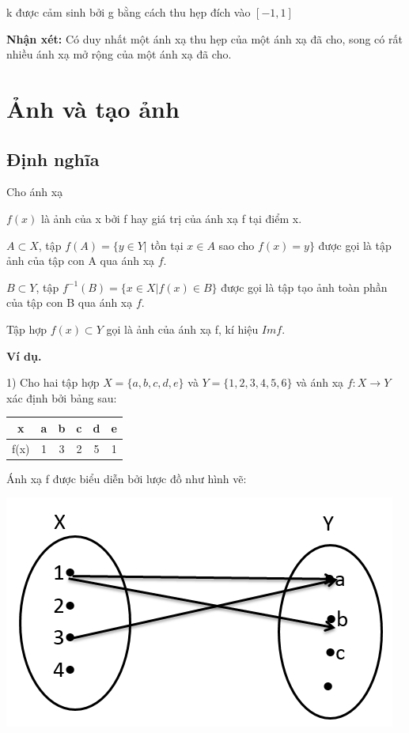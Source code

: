 \documentclass[12pt,oneside,a4paper,reqno]{book}
\begin{document}
         k được cảm sinh bởi g bằng cách thu hẹp đích vào $[-1,1]$
         
\textbf{Nhận xét:} Có duy nhất một ánh xạ thu hẹp của một ánh xạ đã cho, song có rất nhiều ánh xạ mở rộng của một ánh xạ đã cho.

\section{Ảnh và tạo ảnh}
\subsection{Định nghĩa}
Cho ánh xạ 

$f(x)$ là ảnh của x bởi f hay giá trị của ánh xạ f tại điểm x.

$A\subset X$, tập $f(A)=\{y\in Y|$ tồn tại $x\in A$ sao cho $f(x)=y\}$ được gọi là tập ảnh của tập con A qua ánh xạ $f$.

$B\subset Y$, tập $f^{-1} (B)=\{x\in X| f(x)\in B\}$ được gọi là tập tạo ảnh toàn phần của tập con B qua ánh xạ $f$.

Tập hợp $f(x)\subset Y$ gọi là ảnh của ánh xạ f, kí hiệu $Imf$.

\textbf{Ví dụ.}

1) Cho hai tập hợp $X=\{a,b,c,d,e\}$ và $Y=\{1,2,3,4,5,6\}$ và ánh xạ $f:X\to Y$ xác định bởi bảng sau:

\begin{tabular}{|c|c|c|c|c|c|}
    \hline
    x & a & b&c&d&e \\ \hline
    f(x)  & 1   & 3&2&5&1   \\ \hline
\end{tabular}
 
Ánh xạ f được biểu diễn bởi lược đồ như hình vẽ:

\includegraphics{hinh2}
\end{document}
